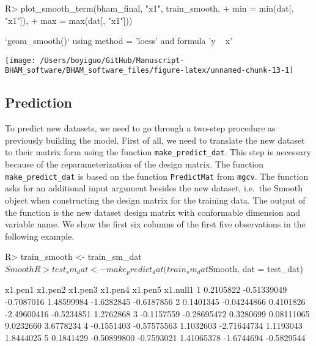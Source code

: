 \documentclass[
]{jss}
\begin{document}
\begin{CodeChunk}
\begin{CodeInput}
R> plot_smooth_term(bham_final, "x1", train_smooth,
+                      min = min(dat[, "x1"]),
+                      max = max(dat[, "x1"]))
\end{CodeInput}
\begin{CodeOutput}
`geom_smooth()` using method = 'loess' and formula 'y ~ x'
\end{CodeOutput}


\begin{center}\texttt{[image: /Users/boyiguo/GitHub/Manuscript-BHAM\_software/BHAM\_software\_files/figure-latex/unnamed-chunk-13-1]} \end{center}

\end{CodeChunk}

\subsection{Prediction}

To predict new datasets, we need to go through a two-step procedure as
previously building the model. First of all, we need to translate the
new dataset to their matrix form using the function
\texttt{make\_predict\_dat}. This step is necessary because of the
reparameterization of the design matrix. The function
\texttt{make\_predict\_dat} is based on the function \texttt{PredictMat}
from \texttt{mgcv}. The function asks for an additional input argument
besides the new dataset, i.e.~the Smooth object when constructing the
design matrix for the training data. The output of the function is the
new dataset design matrix with conformable dimension and variable name.
We show the first six columns of the first five observations in the
following example.

\begin{CodeChunk}
\begin{CodeInput}
R> train_smooth <- train_sm_dat$Smooth
R> test_sm_dat <- make_predict_dat(train_sm_dat$Smooth, dat = test_dat)
\end{CodeInput}
\end{CodeChunk}

\begin{CodeChunk}
\begin{CodeOutput}
     x1.pen1     x1.pen2    x1.pen3     x1.pen4    x1.pen5   x1.null1
1  0.2105822 -0.51339049 -0.7087016  1.48599984 -1.6282845 -0.6187856
2  0.1401345 -0.04244866  0.4101826 -2.49600416 -0.5234851  1.2762868
3 -0.1157559 -0.28695472  0.3280699  0.08111065  9.0232660  3.6778234
4 -0.1551403 -0.57575563  1.1032603 -2.71644734  1.1193043  1.8444025
5  0.1841429 -0.50899800 -0.7593021  1.41065378 -1.6744694 -0.5829544
\end{CodeOutput}
\end{CodeChunk}
\end{document}
